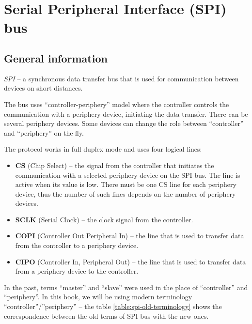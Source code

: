 \documentclass[../sparc.tex]{subfiles}
\begin{document}
\newpage
\section{Serial Peripheral Interface (SPI) bus}
\label{section:spi}

\subsection{General information}

\textit{\gls{SPI}} -- a synchronous data transfer bus that is used for
communication between devices on short distances.

The bus uses ``controller-periphery'' model where the controller controls the
communication with a periphery device, initiating the data transfer.  There can
be several periphery devices.  Some devices can change the role between
``controller'' and ``periphery'' on the fly.

The protocol works in full duplex mode and uses four \cite{arduino:spi} logical
lines:

\begin{itemize}
\item \textbf{CS} (Chip Select) -- the signal from the controller that initiates
  the communication with a selected periphery device on the SPI bus.  The line
  is active when its value is low.  There must be one CS line for each periphery
  device, thus the number of such lines depends on the number of periphery
  devices.
\item \textbf{SCLK} (Serial Clock) -- the clock signal from the controller.
\item \textbf{COPI} (Controller Out Peripheral In) -- the line that is used to
  transfer data from the controller to a periphery device.
\item \textbf{CIPO} (Controller In, Peripheral Out) -- the line that is used to
  transfer data from a periphery device to the controller.
\end{itemize}

In the past, terms ``master'' and ``slave'' were used in the place of
``controller'' and ``periphery''.  In this book, we will be using modern
terminology ``controller''/''periphery'' -- the table
\ref{table:spi-old-terminology} shows the correspondence between the old terms
of SPI bus with the new ones.
\end{document}
